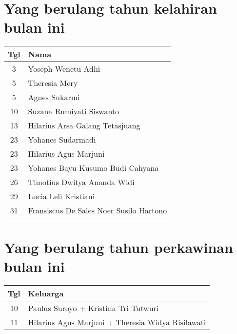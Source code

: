 
\section*{Yang berulang tahun kelahiran bulan ini}


\begin{longtable}{|c|l|} 
\hline Tgl & Nama \\ \hline
3 & Yoseph Wenetu Adhi \\
5 & Theresia Mery \\  
5 & Agnes Sukarmi \\  
10 & Suzana Rumiyati Siswanto \\  
13 & Hilarius Arsa Galang Tetasjuang \\  
23 & Yohanes Sudarmadi \\  
23 & Hilarius Agus Marjuni \\  
23 & Yohanes Bayu Kusumo Budi Cahyana \\  
26 & Timotius Dwitya Ananda Widi \\  
29 & Lucia Leli Kristiani \\  
31 & Fransiscus De Sales Noer Susilo Hartono \\  \hline
 \end{longtable}
 
\section*{Yang berulang tahun perkawinan  bulan ini}


 \begin{longtable}{|c|l|} 
\hline Tgl & Keluarga \\ \hline
10 & Paulus Suroyo + Kristina Tri Tutwuri \\ 
11 & Hilarius Agus Marjuni + Theresia Widya Risilawati\\ \hline 
 \end{longtable}
